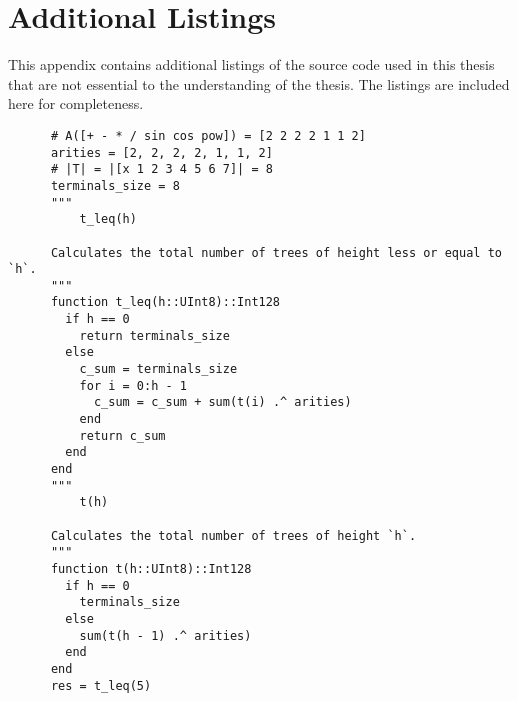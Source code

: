 \chapter{Additional Listings}
\label{app:Listings}
  This appendix contains additional listings of the source code used in this
  thesis that are not essential to the understanding of the thesis.
  The listings are included here for completeness.
  
  \begin{src}
    \label{lst:cardinality_of_T_leq_5}
    \begin{verbatim}
      # A([+ - * / sin cos pow]) = [2 2 2 2 1 1 2]
      arities = [2, 2, 2, 2, 1, 1, 2]
      # |T| = |[x 1 2 3 4 5 6 7]| = 8
      terminals_size = 8
      """
          t_leq(h)

      Calculates the total number of trees of height less or equal to `h`.
      """
      function t_leq(h::UInt8)::Int128
        if h == 0
          return terminals_size
        else
          c_sum = terminals_size
          for i = 0:h - 1
            c_sum = c_sum + sum(t(i) .^ arities)
          end
          return c_sum
        end
      end
      """
          t(h)

      Calculates the total number of trees of height `h`.
      """
      function t(h::UInt8)::Int128
        if h == 0
          terminals_size
        else
          sum(t(h - 1) .^ arities) 
        end
      end
      res = t_leq(5)
    \end{verbatim}
  \end{src}